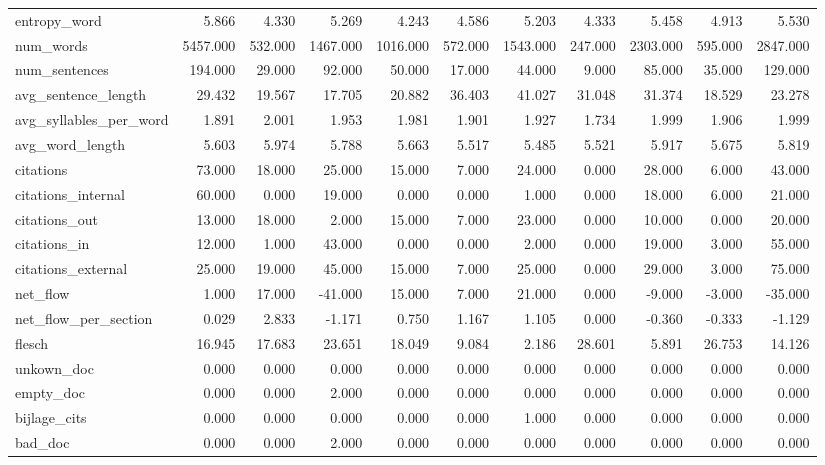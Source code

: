 \begin{tabular}{lrrrrrrrrrr}
\cline{1-11}
entropy\_word & 5.866 & 4.330 & 5.269 & 4.243 & 4.586 & 5.203 & 4.333 & 5.458 & 4.913 & 5.530 \\
\cline{1-11}
num\_words & 5457.000 & 532.000 & 1467.000 & 1016.000 & 572.000 & 1543.000 & 247.000 & 2303.000 & 595.000 & 2847.000 \\
\cline{1-11}
num\_sentences & 194.000 & 29.000 & 92.000 & 50.000 & 17.000 & 44.000 & 9.000 & 85.000 & 35.000 & 129.000 \\
\cline{1-11}
avg\_sentence\_length & 29.432 & 19.567 & 17.705 & 20.882 & 36.403 & 41.027 & 31.048 & 31.374 & 18.529 & 23.278 \\
\cline{1-11}
avg\_syllables\_per\_word & 1.891 & 2.001 & 1.953 & 1.981 & 1.901 & 1.927 & 1.734 & 1.999 & 1.906 & 1.999 \\
\cline{1-11}
avg\_word\_length & 5.603 & 5.974 & 5.788 & 5.663 & 5.517 & 5.485 & 5.521 & 5.917 & 5.675 & 5.819 \\
\cline{1-11}
citations & 73.000 & 18.000 & 25.000 & 15.000 & 7.000 & 24.000 & 0.000 & 28.000 & 6.000 & 43.000 \\
\cline{1-11}
citations\_internal & 60.000 & 0.000 & 19.000 & 0.000 & 0.000 & 1.000 & 0.000 & 18.000 & 6.000 & 21.000 \\
\cline{1-11}
citations\_out & 13.000 & 18.000 & 2.000 & 15.000 & 7.000 & 23.000 & 0.000 & 10.000 & 0.000 & 20.000 \\
\cline{1-11}
citations\_in & 12.000 & 1.000 & 43.000 & 0.000 & 0.000 & 2.000 & 0.000 & 19.000 & 3.000 & 55.000 \\
\cline{1-11}
citations\_external & 25.000 & 19.000 & 45.000 & 15.000 & 7.000 & 25.000 & 0.000 & 29.000 & 3.000 & 75.000 \\
\cline{1-11}
net\_flow & 1.000 & 17.000 & -41.000 & 15.000 & 7.000 & 21.000 & 0.000 & -9.000 & -3.000 & -35.000 \\
\cline{1-11}
net\_flow\_per\_section & 0.029 & 2.833 & -1.171 & 0.750 & 1.167 & 1.105 & 0.000 & -0.360 & -0.333 & -1.129 \\
\cline{1-11}
flesch & 16.945 & 17.683 & 23.651 & 18.049 & 9.084 & 2.186 & 28.601 & 5.891 & 26.753 & 14.126 \\
\cline{1-11}
unkown\_doc & 0.000 & 0.000 & 0.000 & 0.000 & 0.000 & 0.000 & 0.000 & 0.000 & 0.000 & 0.000 \\
\cline{1-11}
empty\_doc & 0.000 & 0.000 & 2.000 & 0.000 & 0.000 & 0.000 & 0.000 & 0.000 & 0.000 & 0.000 \\
\cline{1-11}
bijlage\_cits & 0.000 & 0.000 & 0.000 & 0.000 & 0.000 & 1.000 & 0.000 & 0.000 & 0.000 & 0.000 \\
\cline{1-11}
bad\_doc & 0.000 & 0.000 & 2.000 & 0.000 & 0.000 & 0.000 & 0.000 & 0.000 & 0.000 & 0.000 \\
\cline{1-11}
\bottomrule
\end{tabular}
